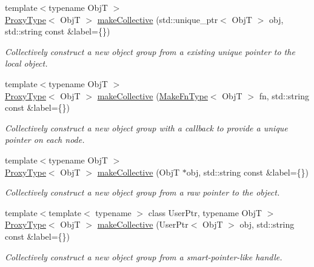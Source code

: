 \begin{DoxyCompactItemize}
{\footnotesize template$<$typename ObjT $>$ }\\\hyperlink{structvt_1_1objgroup_1_1_obj_group_manager_aea65eef52f240a52210132eef5ce591f}{Proxy\+Type}$<$ ObjT $>$ \hyperlink{structvt_1_1objgroup_1_1_obj_group_manager_a73389ca27383b24dac66c361d63a77a9}{make\+Collective} (std\+::unique\+\_\+ptr$<$ ObjT $>$ obj, std\+::string const \&label=\{\})
\begin{DoxyCompactList}\small\item\em Collectively construct a new object group from a existing unique pointer to the local object. \end{DoxyCompactList}\item 
{\footnotesize template$<$typename ObjT $>$ }\\\hyperlink{structvt_1_1objgroup_1_1_obj_group_manager_aea65eef52f240a52210132eef5ce591f}{Proxy\+Type}$<$ ObjT $>$ \hyperlink{structvt_1_1objgroup_1_1_obj_group_manager_a53ec71fc8319d0d28ff8936bfd6aa9cc}{make\+Collective} (\hyperlink{structvt_1_1objgroup_1_1_obj_group_manager_a397d787b3876752a6d70511b2769b872}{Make\+Fn\+Type}$<$ ObjT $>$ fn, std\+::string const \&label=\{\})
\begin{DoxyCompactList}\small\item\em Collectively construct a new object group with a callback to provide a unique pointer on each node. \end{DoxyCompactList}\item 
{\footnotesize template$<$typename ObjT $>$ }\\\hyperlink{structvt_1_1objgroup_1_1_obj_group_manager_aea65eef52f240a52210132eef5ce591f}{Proxy\+Type}$<$ ObjT $>$ \hyperlink{structvt_1_1objgroup_1_1_obj_group_manager_afa9fa99bc40fef73a3f6677e8d1949e2}{make\+Collective} (ObjT $\ast$obj, std\+::string const \&label=\{\})
\begin{DoxyCompactList}\small\item\em Collectively construct a new object group from a raw pointer to the object. \end{DoxyCompactList}\item 
{\footnotesize template$<$template$<$ typename $>$ class User\+Ptr, typename ObjT $>$ }\\\hyperlink{structvt_1_1objgroup_1_1_obj_group_manager_aea65eef52f240a52210132eef5ce591f}{Proxy\+Type}$<$ ObjT $>$ \hyperlink{structvt_1_1objgroup_1_1_obj_group_manager_ad3f50973e210f5829ad0c77f7b950990}{make\+Collective} (User\+Ptr$<$ ObjT $>$ obj, std\+::string const \&label=\{\})
\begin{DoxyCompactList}\small\item\em Collectively construct a new object group from a smart-\/pointer-\/like handle. \end{DoxyCompactList}\item 

\end{DoxyCompactItemize}
